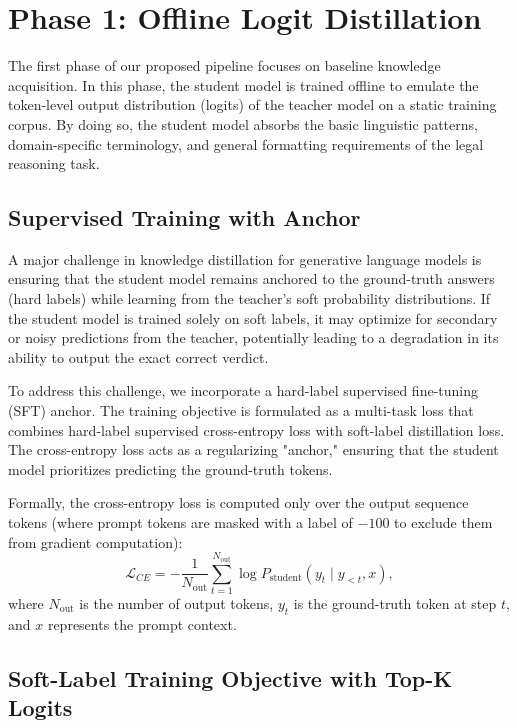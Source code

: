 \section{Phase 1: Offline Logit Distillation}

The first phase of our proposed pipeline focuses on baseline knowledge acquisition. In this phase, the student model is trained offline to emulate the token-level output distribution (logits) of the teacher model on a static training corpus. By doing so, the student model absorbs the basic linguistic patterns, domain-specific terminology, and general formatting requirements of the legal reasoning task.

\subsection{Supervised Training with Anchor}

A major challenge in knowledge distillation for generative language models is ensuring that the student model remains anchored to the ground-truth answers (hard labels) while learning from the teacher's soft probability distributions. If the student model is trained solely on soft labels, it may optimize for secondary or noisy predictions from the teacher, potentially leading to a degradation in its ability to output the exact correct verdict.

To address this challenge, we incorporate a hard-label supervised fine-tuning (SFT) anchor. The training objective is formulated as a multi-task loss that combines hard-label supervised cross-entropy loss with soft-label distillation loss. The cross-entropy loss acts as a regularizing "anchor," ensuring that the student model prioritizes predicting the ground-truth tokens. 

Formally, the cross-entropy loss is computed only over the output sequence tokens (where prompt tokens are masked with a label of $-100$ to exclude them from gradient computation):
\begin{equation}
    \mathcal{L}_{CE} = -\frac{1}{N_{\text{out}}} \sum_{t=1}^{N_{\text{out}}} \log P_{\text{student}}(y_t \mid y_{<t}, x),
\end{equation}
where $N_{\text{out}}$ is the number of output tokens, $y_t$ is the ground-truth token at step $t$, and $x$ represents the prompt context.

\subsection{Soft-Label Training Objective with Top-K Logits}

